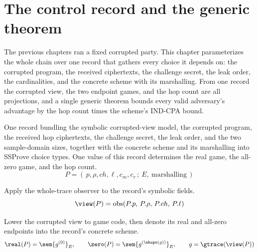 \chapter{The control record and the generic theorem}

The previous chapters ran a fixed corrupted party. This chapter parameterizes the
whole chain over one record that gathers every choice it depends on: the
corrupted program, the received ciphertexts, the challenge secret, the leak
order, the cardinalities, and the concrete scheme with its marshalling. From one
record the corrupted view, the two endpoint games, and the hop count are all
projections, and a single generic theorem bounds every valid adversary's
advantage by the hop count times the scheme's IND-CPA bound.

\begin{definition}
  \label{def:secrecy_problem}
  \rocqok
  One record bundling the symbolic corrupted-view model, the corrupted program,
  the received hop ciphertexts, the challenge secret, the leak order, and the two
  sample-domain sizes, together with the concrete scheme and its marshalling into
  SSProve choice types. One value of this record determines the real game, the
  all-zero game, and the hop count.
  \[ P = (\, p, \rho, ch, \ell, c_m, c_r \,;\ E,\ \text{marshalling} \,) \]
\end{definition}

\begin{definition}
  \label{def:corrupted_view}
  \rocqok
  Apply the whole-trace observer to the record's symbolic fields.
  \[ \view(P) = \mathrm{obs}(P.p,\, P.\rho,\, P.ch,\, P.\ell) \]
\end{definition}

\begin{definition}
  \label{def:games}
  \rocqok
  Lower the corrupted view to game code, then denote its real and all-zero
  endpoints into the record's concrete scheme.
  \[ \real(P) = \sem{g^{(0)}}_E, \qquad \zero(P) = \sem{g^{(\nhops(g))}}_E,
        \qquad g = \gtrace(\view(P)) \]
\end{definition}

